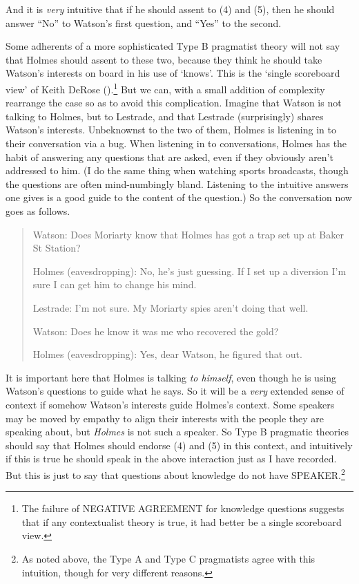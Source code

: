 \documentclass[
  10pt,
  letterpaper,
  DIV=11,
  numbers=noendperiod,
  twoside]{scrartcl}
\begin{document}
And it is \emph{very} intuitive that if he should assent to (4) and (5),
then he should answer ``No'' to Watson's first question, and ``Yes'' to
the second.

Some adherents of a more sophisticated Type B pragmatist theory will not
say that Holmes should assent to these two, because they think he should
take Watson's interests on board in his use of `knows'. This is the
`single scoreboard view' of Keith DeRose
().\footnote{The failure of NEGATIVE
  AGREEMENT for knowledge questions suggests that if any contextualist
  theory is true, it had better be a single scoreboard view.} But we
can, with a small addition of complexity rearrange the case so as to
avoid this complication. Imagine that Watson is not talking to Holmes,
but to Lestrade, and that Lestrade (surprisingly) shares Watson's
interests. Unbeknownst to the two of them, Holmes is listening in to
their conversation via a bug. When listening in to conversations, Holmes
has the habit of answering any questions that are asked, even if they
obviously aren't addressed to him. (I do the same thing when watching
sports broadcasts, though the questions are often mind-numbingly bland.
Listening to the intuitive answers one gives is a good guide to the
content of the question.) So the conversation now goes as follows.

\begin{quote}
Watson: Does Moriarty know that Holmes has got a trap set up at Baker St
Station?

Holmes (eavesdropping): No, he's just guessing. If I set up a diversion
I'm sure I can get him to change his mind.

Lestrade: I'm not sure. My Moriarty spies aren't doing that well.

Watson: Does he know it was me who recovered the gold?

Holmes (eavesdropping): Yes, dear Watson, he figured that out.
\end{quote}

It is important here that Holmes is talking \emph{to himself}, even
though he is using Watson's questions to guide what he says. So it will
be a \emph{very} extended sense of context if somehow Watson's interests
guide Holmes's context. Some speakers may be moved by empathy to align
their interests with the people they are speaking about, but
\emph{Holmes} is not such a speaker. So Type B pragmatic theories should
say that Holmes should endorse (4) and (5) in this context, and
intuitively if this is true he should speak in the above interaction
just as I have recorded. But this is just to say that questions about
knowledge do not have SPEAKER.\footnote{As noted above, the Type A and
  Type C pragmatists agree with this intuition, though for very
  different reasons.}
\end{document}
